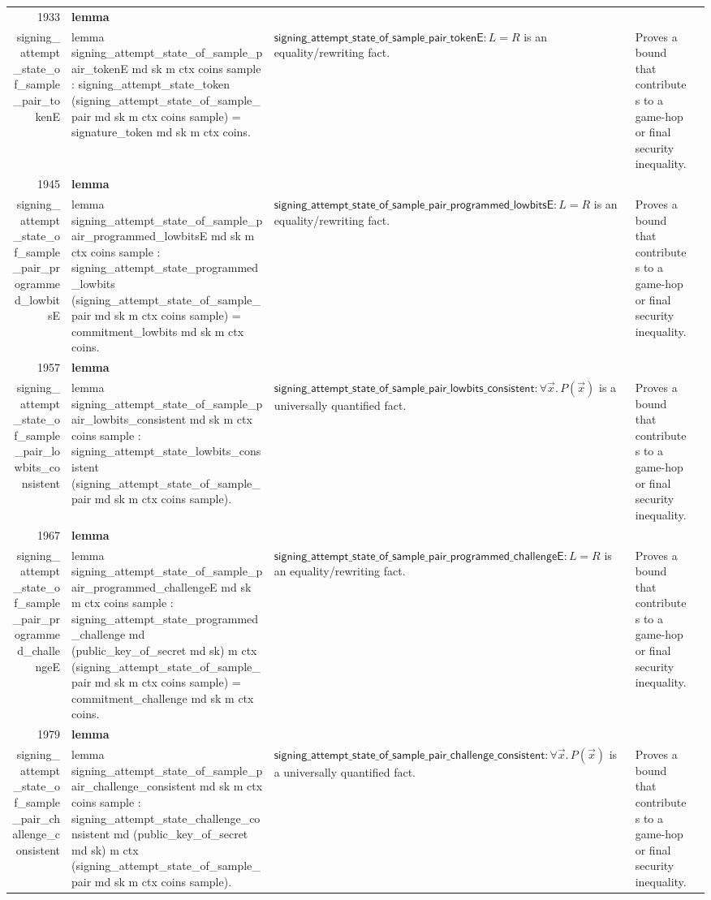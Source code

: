 \documentclass[10pt]{article}
\newcommand{\ec}[1]{\begingroup\ttfamily\scriptsize #1\endgroup}
\begin{document}
\begin{longtable}{r L{0.17\textwidth} L{0.26\textwidth} L{0.27\textwidth} L{0.20\textwidth}}
1933 & \textbf{lemma}\\\ec{signing\_attempt\_state\_of\_sample\_pair\_tokenE} & \ec{lemma signing\_attempt\_state\_of\_sample\_pair\_tokenE md sk m ctx coins sample : signing\_attempt\_state\_token (signing\_attempt\_state\_of\_sample\_pair md sk m ctx coins sample) = signature\_token md sk m ctx coins.} & \(\mathsf{signing\_attempt\_state\_of\_sample\_pair\_tokenE} : L = R\) is an equality/rewriting fact. & Proves a bound that contributes to a game-hop or final security inequality. \\
1945 & \textbf{lemma}\\\ec{signing\_attempt\_state\_of\_sample\_pair\_programmed\_lowbitsE} & \ec{lemma signing\_attempt\_state\_of\_sample\_pair\_programmed\_lowbitsE md sk m ctx coins sample : signing\_attempt\_state\_programmed\_lowbits (signing\_attempt\_state\_of\_sample\_pair md sk m ctx coins sample) = commitment\_lowbits md sk m ctx coins.} & \(\mathsf{signing\_attempt\_state\_of\_sample\_pair\_programmed\_lowbitsE} : L = R\) is an equality/rewriting fact. & Proves a bound that contributes to a game-hop or final security inequality. \\
1957 & \textbf{lemma}\\\ec{signing\_attempt\_state\_of\_sample\_pair\_lowbits\_consistent} & \ec{lemma signing\_attempt\_state\_of\_sample\_pair\_lowbits\_consistent md sk m ctx coins sample : signing\_attempt\_state\_lowbits\_consistent (signing\_attempt\_state\_of\_sample\_pair md sk m ctx coins sample).} & \(\mathsf{signing\_attempt\_state\_of\_sample\_pair\_lowbits\_consistent} : \forall \vec{x}.\, P(\vec{x})\) is a universally quantified fact. & Proves a bound that contributes to a game-hop or final security inequality. \\
1967 & \textbf{lemma}\\\ec{signing\_attempt\_state\_of\_sample\_pair\_programmed\_challengeE} & \ec{lemma signing\_attempt\_state\_of\_sample\_pair\_programmed\_challengeE md sk m ctx coins sample : signing\_attempt\_state\_programmed\_challenge md (public\_key\_of\_secret md sk) m ctx (signing\_attempt\_state\_of\_sample\_pair md sk m ctx coins sample) = commitment\_challenge md sk m ctx coins.} & \(\mathsf{signing\_attempt\_state\_of\_sample\_pair\_programmed\_challengeE} : L = R\) is an equality/rewriting fact. & Proves a bound that contributes to a game-hop or final security inequality. \\
1979 & \textbf{lemma}\\\ec{signing\_attempt\_state\_of\_sample\_pair\_challenge\_consistent} & \ec{lemma signing\_attempt\_state\_of\_sample\_pair\_challenge\_consistent md sk m ctx coins sample : signing\_attempt\_state\_challenge\_consistent md (public\_key\_of\_secret md sk) m ctx (signing\_attempt\_state\_of\_sample\_pair md sk m ctx coins sample).} & \(\mathsf{signing\_attempt\_state\_of\_sample\_pair\_challenge\_consistent} : \forall \vec{x}.\, P(\vec{x})\) is a universally quantified fact. & Proves a bound that contributes to a game-hop or final security inequality. \\

\end{longtable}
\end{document}
